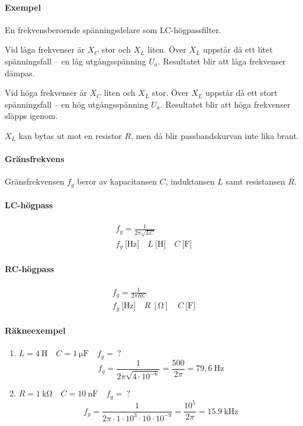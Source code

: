 \paragraph{Exempel} En frekvensberoende spänningsdelare som LC-högpassfilter.

Vid låga frekvenser är \(X_C\) stor och \(X_L\) liten.
Över \(X_L\) uppstår då ett litet spänningsfall -- en låg utgångsspänning \(U_a\).
Resultatet blir att låga frekvenser dämpas.

Vid höga frekvenser är \(X_C\) liten och \(X_L\) stor.
Över \(X_L\) uppstår då ett stort spänningsfall -- en hög utgångsspänning
\(U_a\).
Resultatet blir att höga frekvenser släpps igenom.

\(X_L\) kan bytas ut mot en resistor \(R\), men då blir passbandskurvan inte lika brant.

\paragraph{Gränsfrekvens}

Gränsfrekvensen \(f_g\) beror av kapacitansen \(C\), induktansen \(L\) samt
resistansen \(R\).

\paragraph{LC-högpass}
\begin{gather*}
  f_g = \frac{1}{2\pi \sqrt{LC}} \\
  f_g\ \text{[Hz]} \quad L\ \text{[H]} \quad C\ \text{[F]}
\end{gather*}

\paragraph{RC-högpass}
\begin{gather*}
  f_g = \frac{1}{2\pi RC}\\
  f_g\ \text{[Hz]} \quad R\ [\unit{\ohm}] \quad C\ \text{[F]}
\end{gather*}

\paragraph{Räkneexempel}
\begin{enumerate}
\item \(L = 4\ \text{H} \quad C = 1\ \unit{\micro\farad} \quad f_g =\ ?\)
  \[
  f_g = \frac{1}{2\pi \sqrt{4 \cdot 10^{-6}}} = \frac{500}{2\pi }
  = 79,6\ \text{Hz}
  \]
\item \(R = \qty{1}{\kilo\ohm} \quad C = 10\ \text{nF} \quad f_g =\ ?\)
  \[
    f_g = \frac{1}{2\pi  \cdot 1 \cdot 10^3 \cdot 10 \cdot 10^{-9}}
    = \frac{10^5}{2\pi } = \qty{15,9}{\kilo\hertz}
  \]
\end{enumerate}


